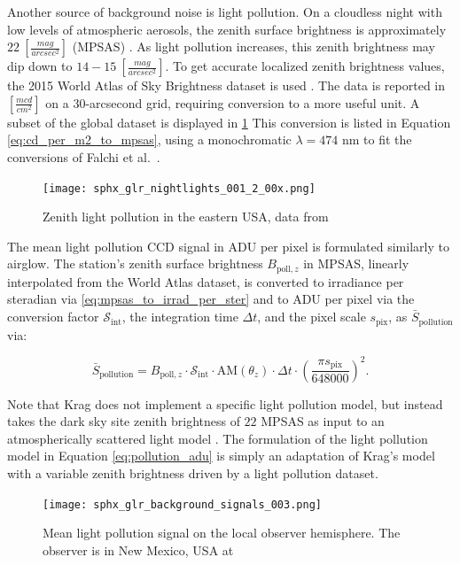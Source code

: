 Another source of background noise is light pollution. On a cloudless night with low levels of atmospheric aerosols, 
the zenith surface brightness is approximately $22 \: \left[ \frac{mag}{arcsec^2}
\right]$ (MPSAS) \cite{krag2003}. As light pollution increases, this zenith brightness may dip down to
$14-15 \: \left[ \frac{mag}{arcsec^2} \right]$. To get accurate localized zenith brightness values,
 the 2015 World Atlas of Sky Brightness dataset is used \cite{falchi2016_data}. The data is reported in $\left[
	\frac{mcd}{cm^2} \right]$ on a 30-arcsecond grid, requiring conversion to a more useful unit. A subset of the global dataset is displayed in \ref{fig:pollution_data} This conversion is listed in Equation \ref{eq:cd_per_m2_to_mpsas}, using a monochromatic $\lambda = 474$ nm to fit the conversions of Falchi et al.\ \cite{falchi2016}.  

\begin{figure}[ht]
  \centering
  \texttt{[image: sphx\_glr\_nightlights\_001\_2\_00x.png]}
  \caption{Zenith light pollution in the eastern USA, data from \cite{falchi2016_data}}
  \label{fig:pollution_data}
\end{figure}

The mean light pollution CCD signal in ADU per pixel is formulated similarly to airglow. The station's zenith surface brightness $B_{\mathrm{poll},z}$ in MPSAS, linearly interpolated from the World Atlas dataset, is converted to irradiance per steradian via \ref{eq:mpsas_to_irrad_per_ster} and to ADU per pixel via the conversion factor $\mathcal{S}_\mathrm{int}$, the integration time $\Delta t$, and the pixel scale $s_\mathrm{pix}$, as $\bar{S}_\mathrm{pollution}$ via:
 
\begin{equation} \label{eq:pollution_adu}
  \bar{S}_\mathrm{pollution} = B_{\mathrm{poll},z} \cdot \mathcal{S}_\mathrm{int} \cdot \textrm{AM}(\theta_z) \cdot \Delta t \cdot \left( \frac{\pi s_\mathrm{pix}}{648000} \right)^2.
\end{equation}

Note that Krag does not implement a specific light pollution model, but instead takes the dark sky site zenith brightness of $22$ MPSAS as input to an atmospherically scattered light model \cite{krag2003}. The formulation of the light pollution model in Equation \ref{eq:pollution_adu} is simply an adaptation of Krag's model with a variable zenith brightness driven by a light pollution dataset.

\begin{figure}[ht]
  \centering
  \texttt{[image: sphx\_glr\_background\_signals\_003.png]}
  \caption{Mean light pollution signal on the local observer hemisphere. The observer is in New Mexico, USA at
  \pogslla}
  \label{fig:pollution_hemi}
\end{figure}

